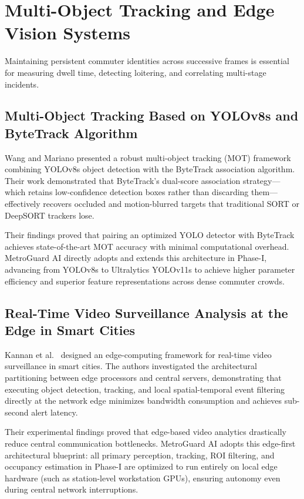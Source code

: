 \documentclass[12pt,a4paper]{report}
\begin{document}
\section{Multi-Object Tracking and Edge Vision Systems}
Maintaining persistent commuter identities across successive frames is essential for measuring dwell time, detecting loitering, and correlating multi-stage incidents.

\subsection{Multi-Object Tracking Based on YOLOv8s and ByteTrack Algorithm}
Wang and Mariano \cite{p7} presented a robust multi-object tracking (MOT) framework combining YOLOv8s object detection with the ByteTrack association algorithm. Their work demonstrated that ByteTrack's dual-score association strategy---which retains low-confidence detection boxes rather than discarding them---effectively recovers occluded and motion-blurred targets that traditional SORT or DeepSORT trackers lose.

Their findings proved that pairing an optimized YOLO detector with ByteTrack achieves state-of-the-art MOT accuracy with minimal computational overhead. MetroGuard AI directly adopts and extends this architecture in Phase-I, advancing from YOLOv8s to Ultralytics YOLOv11s to achieve higher parameter efficiency and superior feature representations across dense commuter crowds.

\subsection{Real-Time Video Surveillance Analysis at the Edge in Smart Cities}
Kannan et al.\ \cite{p13} designed an edge-computing framework for real-time video surveillance in smart cities. The authors investigated the architectural partitioning between edge processors and central servers, demonstrating that executing object detection, tracking, and local spatial-temporal event filtering directly at the network edge minimizes bandwidth consumption and achieves sub-second alert latency.

Their experimental findings proved that edge-based video analytics drastically reduce central communication bottlenecks. MetroGuard AI adopts this edge-first architectural blueprint: all primary perception, tracking, ROI filtering, and occupancy estimation in Phase-I are optimized to run entirely on local edge hardware (such as station-level workstation GPUs), ensuring autonomy even during central network interruptions.
\end{document}

